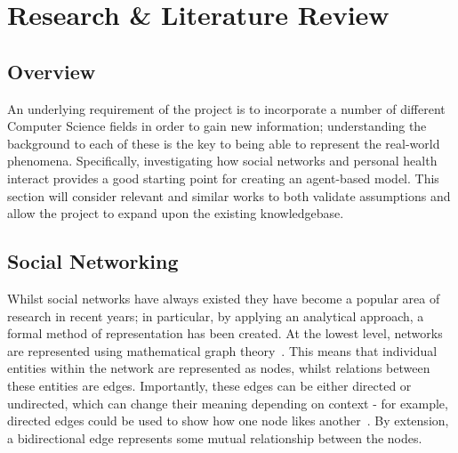 \documentclass[]{report}
\begin{document}
%
%

%
%
\chapter{Research \& Literature Review}
\label{sec:litrev}
\section{Overview}
An underlying requirement of the project is to incorporate a number of different Computer Science fields in order to gain new information; understanding the background to each of these is the key to being able to represent the real-world phenomena. Specifically, investigating how social networks and personal health interact provides a good starting point for creating an agent-based model. This section will consider relevant and similar works to both validate assumptions and allow the project to expand upon the existing knowledgebase.

\section{Social Networking}
\label{sec:litrev-socnet}
Whilst social networks have always existed they have become a popular area of research in recent years; in particular, by applying an analytical approach, a formal method of representation has been created. At the lowest level, networks are represented using mathematical graph theory~\cite{NetMark-21}. This means that individual entities within the network are represented as nodes, whilst relations between these entities are edges. Importantly, these edges can be either directed or undirected, which can change their meaning depending on context - for example, directed edges could be used to show how one node likes another~\cite{USN-14}. By extension, a bidirectional edge represents some mutual relationship between the nodes.
\end{document}
